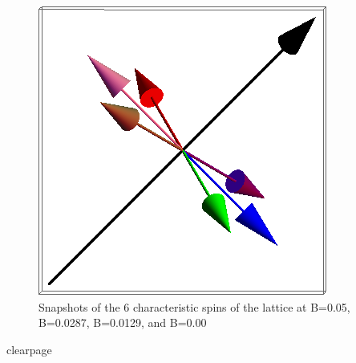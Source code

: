 \documentclass{article}
\begin{document}
\begin{figure}[ht]
\includegraphics[scale=0.32]{111_3000/501S005to000G.png}
\caption{Snapshots of the 6 characteristic spins of the lattice at B=0.05, B=0.0287, B=0.0129, and B=0.00}
\end{figure}
clearpage
\end{document}
